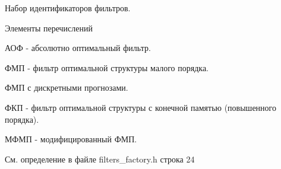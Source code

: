 Набор идентификаторов фильтров. 

\begin{Desc}
\item[Элементы перечислений]\par
\begin{description}
\item[{\em 
A\+OF\hypertarget{namespace_filters_a1b615faac44ef992d0af44da40ff26d7afb2e0194a4c38c00b93fb1222c7df34a}{}\label{namespace_filters_a1b615faac44ef992d0af44da40ff26d7afb2e0194a4c38c00b93fb1222c7df34a}
}]АОФ -\/ абсолютно оптимальный фильтр. \item[{\em 
F\+OS\hypertarget{namespace_filters_a1b615faac44ef992d0af44da40ff26d7a12afbc0c8b3d0ec4d03bb3254eec87a0}{}\label{namespace_filters_a1b615faac44ef992d0af44da40ff26d7a12afbc0c8b3d0ec4d03bb3254eec87a0}
}]ФМП -\/ фильтр оптимальной структуры малого порядка. \item[{\em 
D\+F\+OS\hypertarget{namespace_filters_a1b615faac44ef992d0af44da40ff26d7a7d07d86f2caba0db54a7b3464451b0aa}{}\label{namespace_filters_a1b615faac44ef992d0af44da40ff26d7a7d07d86f2caba0db54a7b3464451b0aa}
}]ФМП с дискретными прогнозами. \item[{\em 
D\+F\+O\+S\+BO\hypertarget{namespace_filters_a1b615faac44ef992d0af44da40ff26d7acbecfce9d58e9013e109cbe14047e9df}{}\label{namespace_filters_a1b615faac44ef992d0af44da40ff26d7acbecfce9d58e9013e109cbe14047e9df}
}]ФКП -\/ фильтр оптимальной структуры с конечной памятью (повышенного порядка). \item[{\em 
M\+D\+F\+OS\hypertarget{namespace_filters_a1b615faac44ef992d0af44da40ff26d7a2c5a562dbfb4545d3fb7270a36bdfcc2}{}\label{namespace_filters_a1b615faac44ef992d0af44da40ff26d7a2c5a562dbfb4545d3fb7270a36bdfcc2}
}]МФМП -\/ модифицированный ФМП. \end{description}
\end{Desc}


См. определение в файле filters\+\_\+factory.\+h строка 24

